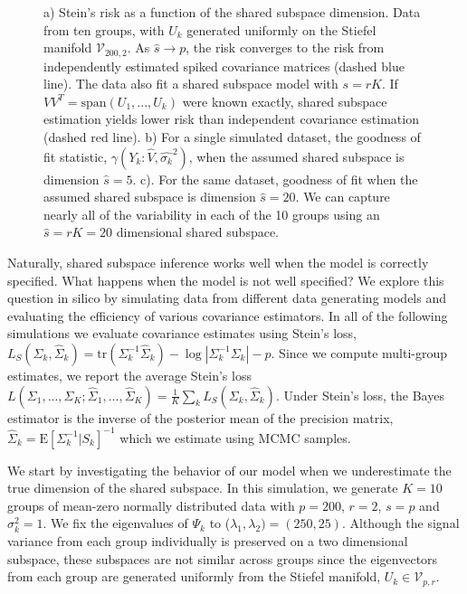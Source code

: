 \documentclass[12pt]{article}
\newcommand{\Exp}[1]{{\text{E}}[ \ensuremath{ #1 } ]  }
\begin{document}
\begin{figure}[t]
    \centering
      \caption{a) Stein's risk as a function of the
      shared subspace dimension.  Data from ten groups, with $U_k$
      generated uniformly on the Stiefel manifold
      $\mathcal{V}_{200, 2}$.  As $\hat{s} \rightarrow p$, the risk converges to the
      risk from independently estimated spiked covariance matrices
      (dashed blue line).  The data also fit a shared subspace model
      with $s=rK$.  If $VV^T = \text{span}(U_1, ..., U_k)$ were known
      exactly, shared subspace estimation yields lower risk than
      independent covariance estimation (dashed red line).  b) For a
      single simulated dataset, the goodness of fit statistic,
      $\gamma(Y_k: \hat{V}, \hat{\sigma_k}^2)$, when the assumed
      shared subspace is dimension $\hat{s} = 5$.  c).  For the same
      dataset, goodness of fit when the assumed shared subspace is
      dimension $\hat{s} = 20$.  We can capture nearly all of the
      variability in each of the 10 groups using an $\hat{s}=rK=20$
      dimensional shared subspace. }
\label{fig:dimensionPlots}
\end{figure}

Naturally, shared subspace inference works well when the model is
correctly specified.  What happens when the model is not well
specified?  We explore this question in silico by simulating data from
different data generating models and evaluating the efficiency of
various covariance estimators.  In all of the following simulations we
evaluate covariance estimates using Stein's loss,
$L_S( \Sigma_k , \hat\Sigma_k) = \text{tr}( \Sigma_k^{-1} \hat
\Sigma_k ) - \log |\Sigma_k^{-1} \Sigma_k | - p$.
Since we compute multi-group estimates, we report the
average Stein's loss
$L(\Sigma_1, ..., \Sigma_K; \hat\Sigma_1, ..., \hat\Sigma_K ) =
\frac{1}{K} \sum_k L_S( \Sigma_k , \hat\Sigma_k)$.
Under Stein's loss, the Bayes estimator is the inverse of
the posterior mean of the precision matrix,
$\hat \Sigma_{k} = \Exp{ \Sigma_k^{-1} | S_k}^{-1}$ which we
estimate using MCMC samples.

We start by investigating the behavior of our model when we
underestimate the true dimension of the shared subspace.  In this
simulation, we generate $K=10$ groups of mean-zero normally
distributed data with $p=200$, $r=2$, $s=p$ and $\sigma_k^2=1$.  We
fix the eigenvalues of $\Psi_k$ to
($\lambda_1, \lambda_2) = (250, 25)$.  Although the signal variance
from each group individually is preserved on a two dimensional
subspace, these subspaces are not similar across groups since the
eigenvectors from each group are generated uniformly from the Stiefel
manifold, $U_k \in \mathcal{V}_{p, r}$.
\end{document}
